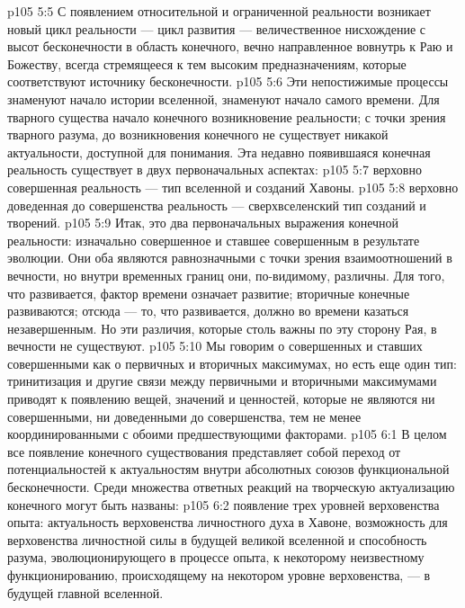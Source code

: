\vs p105 5:5 С появлением относительной и ограниченной реальности возникает новый цикл реальности --- цикл развития --- величественное нисхождение с высот бесконечности в область конечного, вечно направленное вовнутрь к Раю и Божеству, всегда стремящееся к тем высоким предназначениям, которые соответствуют источнику бесконечности.
\vs p105 5:6 Эти непостижимые процессы знаменуют начало истории вселенной, знаменуют начало самого времени. Для тварного существа начало конечного  возникновение реальности; с точки зрения тварного разума, до возникновения конечного не существует никакой актуальности, доступной для понимания. Эта недавно появившаяся конечная реальность существует в двух первоначальных аспектах:
\vs p105 5:7 \bibnobreakspace {} верховно совершенная реальность --- тип вселенной и созданий Хавоны.
\vs p105 5:8 \bibnobreakspace {} верховно доведенная до совершенства реальность --- сверхвселенский тип созданий и творений.
\vs p105 5:9 \pc Итак, это два первоначальных выражения конечной реальности: изначально совершенное и ставшее совершенным в результате эволюции. Они оба являются равнозначными с точки зрения взаимоотношений в вечности, но внутри временных границ они, по\hyp{}видимому, различны. Для того, что развивается, фактор времени означает развитие; вторичные конечные развиваются; отсюда --- то, что развивается, должно во времени казаться незавершенным. Но эти различия, которые столь важны по эту сторону Рая, в вечности не существуют.
\vs p105 5:10 Мы говорим о совершенных и ставших совершенными как о первичных и вторичных максимумах, но есть еще один тип: тринитизация и другие связи между первичными и вторичными максимумами приводят к появлению  вещей, значений и ценностей, которые не являются ни совершенными, ни доведенными до совершенства, тем не менее координированными с обоими предшествующими факторами.
\vs p105 6:1 В целом все появление конечного существования представляет собой переход от потенциальностей к актуальностям внутри абсолютных союзов функциональной бесконечности. Среди множества ответных реакций на творческую актуализацию конечного могут быть названы:
\vs p105 6:2 \bibnobreakspace {} появление трех уровней верховенства опыта: актуальность верховенства личностного духа в Хавоне, возможность для верховенства личностной силы в будущей великой вселенной и способность разума, эволюционирующего в процессе опыта, к некоторому неизвестному функционированию, происходящему на некотором уровне верховенства, --- в будущей главной вселенной.
